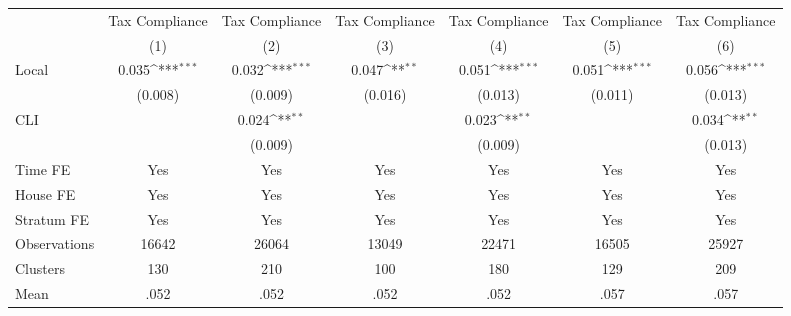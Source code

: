 {
\def\sym#1{\ifmmode^{#1}\else\(^{#1}\)\fi}
\begin{tabular}{l*{6}{c}}
\hline\hline
                &\multicolumn{1}{c}{Tax Compliance}&\multicolumn{1}{c}{Tax Compliance}&\multicolumn{1}{c}{Tax Compliance}&\multicolumn{1}{c}{Tax Compliance}&\multicolumn{1}{c}{Tax Compliance}&\multicolumn{1}{c}{Tax Compliance}\\
                &\multicolumn{1}{c}{(1)}         &\multicolumn{1}{c}{(2)}         &\multicolumn{1}{c}{(3)}         &\multicolumn{1}{c}{(4)}         &\multicolumn{1}{c}{(5)}         &\multicolumn{1}{c}{(6)}         \\
\hline
Local           &    0.035\sym{***}&    0.032\sym{***}&    0.047\sym{**} &    0.051\sym{***}&    0.051\sym{***}&    0.056\sym{***}\\
                &  (0.008)         &  (0.009)         &  (0.016)         &  (0.013)         &  (0.011)         &  (0.013)         \\
CLI             &                  &    0.024\sym{**} &                  &    0.023\sym{**} &                  &    0.034\sym{**} \\
                &                  &  (0.009)         &                  &  (0.009)         &                  &  (0.013)         \\
Time FE         &      Yes         &      Yes         &      Yes         &      Yes         &      Yes         &      Yes         \\
House FE        &      Yes         &      Yes         &      Yes         &      Yes         &      Yes         &      Yes         \\
Stratum FE      &      Yes         &      Yes         &      Yes         &      Yes         &      Yes         &      Yes         \\
\hline
Observations    &    16642         &    26064         &    13049         &    22471         &    16505         &    25927         \\
Clusters        &      130         &      210         &      100         &      180         &      129         &      209         \\
Mean            &     .052         &     .052         &     .052         &     .052         &     .057         &     .057         \\
\hline\hline
\end{tabular}
}

